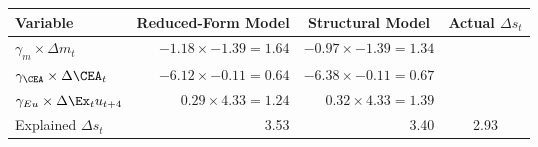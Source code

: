   
\begin{center} \footnotesize
\begin{tabular}{@{}lrrc@{}}\\
\toprule
     Variable & \multicolumn{1}{c}{Reduced-Form Model }& \multicolumn{1}{c}{Structural Model }& \multicolumn{1}{c}{Actual $\Delta s_t$ }\\
\midrule 
$\gamma_m\times\Delta m_t$ & $ -1.18 \times -1.39 = 1.64 $ & $ -0.97 \times -1.39 = 1.34 $ & \\
$\gamma_\CEA\times\Delta \CEA_t$ & $ -6.12 \times -0.11 = 0.64 $ & $ -6.38 \times -0.11 = 0.67 $ &  \\
$\gamma_{Eu}\times\Delta \Ex_t u_{t+4} $ & $ 0.29 \times 4.33 = 1.24 $ & $ 0.32 \times 4.33 = 1.39 $ & \\
\midrule 
Explained $\Delta s_t$ &  3.53 &  3.40 & 2.93\\
\bottomrule
\end{tabular}
\end{center}
